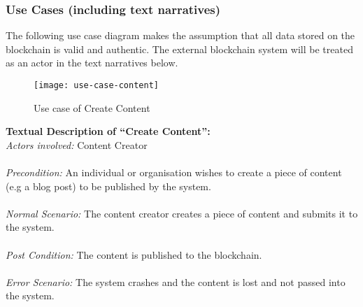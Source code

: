 \subsubsection{Use Cases (including text narratives)}
The following use case diagram makes the assumption that all data stored 
on the blockchain is valid and authentic. The external blockchain system will 
be treated as an actor in the text narratives below.

\begin{figure}[h]
\centering %
\texttt{[image: use-case-content]} %
\caption{Use case of Create Content}
\label{fig: create-content} %
\end{figure}

\noindent
\textbf{Textual Description of “Create Content”:} \\
\textit{Actors involved:} Content Creator \\ \\
\textit{Precondition:} An individual or organisation wishes to create a piece of content 
					   (e.g a blog post) to be published by the system. \\ \\
\textit{Normal Scenario:} The content creator creates a piece of content and submits it to the system. \\ \\
\textit{Post Condition:} The content is published to the blockchain. \\ \\
\textit{Error Scenario:} The system crashes and the content is lost and not passed into the system. \\ \\

